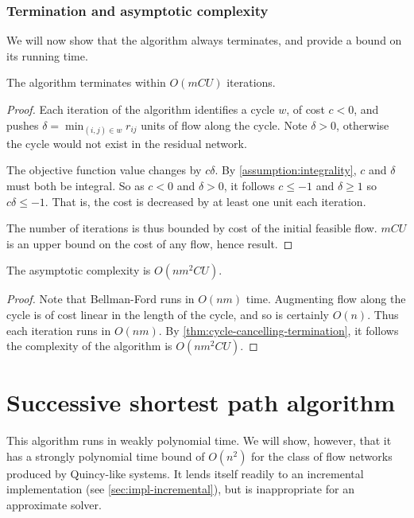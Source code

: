 \subsubsection{Termination and asymptotic complexity}

We will now show that the algorithm always terminates, and provide a bound on its running time.\\

\begin{thm} \label{thm:cycle-cancelling-termination}
The algorithm terminates within $O(mCU)$ iterations.
\end{thm}
\begin{proof}
Each iteration of the algorithm identifies a cycle $w$, of cost $c < 0$, and pushes $\delta = \min_{(i,j) \in w} r_{ij}$ units of flow along the cycle. Note $\delta > 0$, otherwise the cycle would not exist in the residual network. 

The objective function value changes by $c\delta$.  By \cref{assumption:integrality}, $c$ and $\delta$ must both be integral. So as $c < 0$ and $\delta > 0$, it follows $c \leq -1$ and $\delta \geq 1$ so $c\delta \leq -1$. That is, the cost is decreased by at least one unit each iteration.

The number of iterations is thus bounded by cost of the initial feasible flow. $mCU$ is an upper bound on the cost of any flow, hence result.
\end{proof}

\begin{cor} \label{corollary:cycle-cancelling-complexity}
The asymptotic complexity is $O(nm^2CU)$.
\end{cor}
\begin{proof}
Note that Bellman-Ford runs in $O(nm)$ time. Augmenting flow along the cycle is of cost linear in the length of the cycle, and so is certainly $O(n)$. Thus each iteration runs in $O(nm)$. By \cref{thm:cycle-cancelling-termination}, it follows the complexity of the algorithm is $O(nm^2CU)$.
\end{proof}

\section{Successive shortest path algorithm} \label{sec:impl-ssp}

This algorithm runs in weakly polynomial time. We will show, however, that it has a strongly polynomial time bound of $O(n^2)$ for the class of flow networks produced by Quincy-like systems. It lends itself readily to an incremental implementation (see \cref{sec:impl-incremental}), but is inappropriate for an approximate solver.

